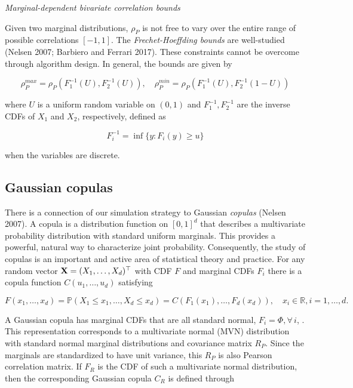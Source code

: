 \documentclass{article}
\begin{document}
\emph{Marginal-dependent bivariate correlation bounds}

Given two marginal distributions, \(\rho_P\) is not free to vary over
the entire range of possible correlations \([-1,1]\). The
\emph{Frechet-Hoeffding bounds} are well-studied (Nelsen 2007; Barbiero
and Ferrari 2017). These constraints cannot be overcome through
algorithm design. In general, the bounds are given by

\begin{equation}
\label{eq:frechet}
\rho_P^{max} = \rho_P \left( F^{-1}_1 (U), F^{-1}_2 (U) \right), \quad \rho_P^{min} = \rho_P \left( F^{-1}_1 (U), F^{-1}_2 (1 - U) \right)
\end{equation}

\noindent where \(U\) is a uniform random variable on \((0,1)\) and
\(F^{-1}_1, F^{-1}_2\) are the inverse CDFs of \(X_1\) and \(X_2\),
respectively, defined as

\begin{equation}
F_{i}^{-1} = \inf\{y:F_{i}(y) \geq u \}
\label{eq:inverseCDF}
\end{equation}

when the variables are discrete.

\hypertarget{gaussian-copulas}{%
\subsection{Gaussian copulas}\label{gaussian-copulas}}

There is a connection of our simulation strategy to Gaussian
\emph{copulas} (Nelsen 2007). A copula is a distribution function on
\([0,1]^d\) that describes a multivariate probability distribution with
standard uniform marginals. This provides a powerful, natural way to
characterize joint probability. Consequently, the study of copulas is an
important and active area of statistical theory and practice. For any
random vector \({\bf X}=(X_1, \ldots, X_d)^\top\) with CDF \(F\) and
marginal CDFs \(F_i\) there is a copula function \(C(u_1, \ldots, u_d)\)
satisfying

\begin{equation}
F(x_1, \ldots, x_d) = {\mathbb P}(X_1\leq x_1, \ldots,X_d\leq x_d) = C(F_1(x_1), \ldots, F_d(x_d)), \quad x_i \in {\mathbb R}, i=1,\ldots,d.
\label{eq:copula}
\end{equation}

A Gaussian copula has marginal CDFs that are all standard normal,
\(F_i = \Phi, \forall \, i\), . This representation corresponds to a
multivariate normal (MVN) distribution with standard normal marginal
distributions and covariance matrix \(R_P\). Since the marginals are
standardized to have unit variance, this \(R_P\) is also Pearson
correlation matrix. If \(F_R\) is the CDF of such a multivariate normal
distribution, then the corresponding Gaussian copula \(C_R\) is defined
through
\end{document}
